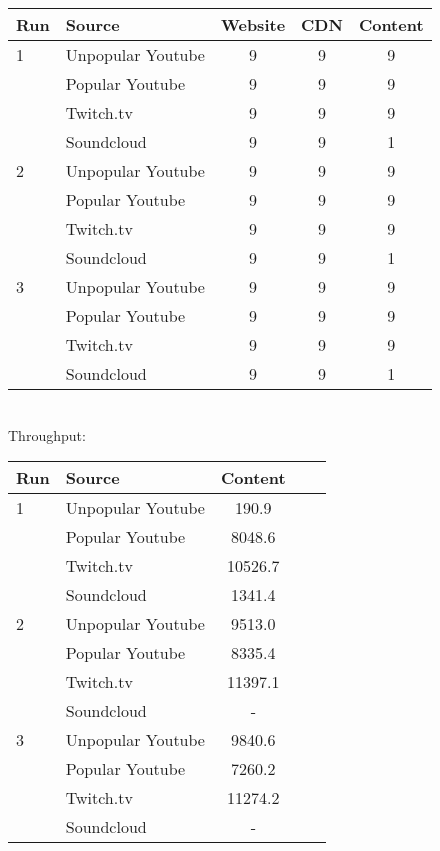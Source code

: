 \documentclass{sig-alternate-05-2015}
\begin{document}
\begin{tabular}{|l|l|c|c|c|} \hline
Run & Source & Website & CDN & Content \\ \hline
1 & Unpopular Youtube & 9 & 9 & 9 \\ \hline
  & Popular Youtube   & 9 & 9 & 9 \\ \hline
  & Twitch.tv         & 9 & 9 & 9 \\ \hline
  & Soundcloud        & 9 & 9 & 1 \\ \hline
2 & Unpopular Youtube & 9 & 9 & 9 \\ \hline
  & Popular Youtube   & 9 & 9 & 9 \\ \hline
  & Twitch.tv         & 9 & 9 & 9 \\ \hline
  & Soundcloud        & 9 & 9 & 1 \\ \hline
3 & Unpopular Youtube & 9 & 9 & 9 \\ \hline
  & Popular Youtube   & 9 & 9 & 9 \\ \hline
  & Twitch.tv         & 9 & 9 & 9 \\ \hline
  & Soundcloud        & 9 & 9 & 1 \\ \hline
\end{tabular}
\vspace{1em} \\
Throughput: \\
\begin{tabular}{|l|l|c|c|c|} \hline
Run & Source & Content \\ \hline
1 & Unpopular Youtube & 190.9   \\ \hline
  & Popular Youtube   & 8048.6  \\ \hline
  & Twitch.tv         & 10526.7 \\ \hline
  & Soundcloud        & 1341.4  \\ \hline
2 & Unpopular Youtube & 9513.0  \\ \hline
  & Popular Youtube   & 8335.4  \\ \hline
  & Twitch.tv         & 11397.1 \\ \hline
  & Soundcloud        & -       \\ \hline
3 & Unpopular Youtube & 9840.6  \\ \hline
  & Popular Youtube   & 7260.2  \\ \hline
  & Twitch.tv         & 11274.2 \\ \hline  
  & Soundcloud        & -       \\ \hline
\end{tabular}
\end{document}
